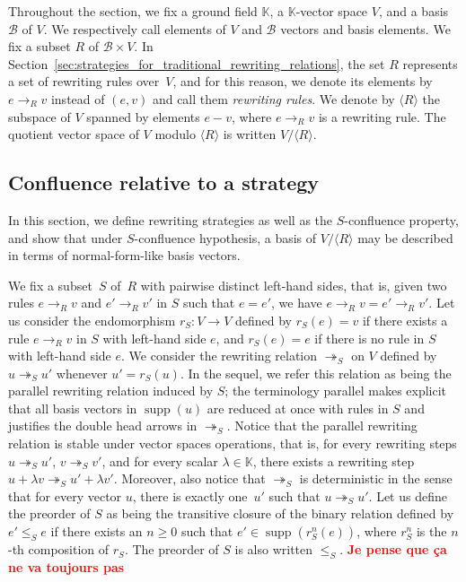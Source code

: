\documentclass[11pt]{article}
\theoremstyle{definition}
\newcommand\todo[1]{{\bf\textcolor{red}{#1}}}
\newcommand\basis{\mathscr{B}}
\newcommand\ordS{\leq_S}
\DeclareMathOperator{\supp}{supp}
\newcommand\K{\mathbb{K}}
\newcommand\Span[1]{\langle #1\rangle}
\newcommand\rewR{\to_R}
\newcommand\parS{\twoheadrightarrow_S}
\begin{document}
Throughout the section, we fix a ground field $\K$, a $\K$-vector space $V$, and
a basis $\basis$ of $V$. We respectively call elements of $V$ and $\basis$
vectors and basis elements. We fix a subset $R$ of $\basis\times V$. In
Section~\ref{sec:strategies_for_traditional_rewriting_relations}, the set $R$
represents a set of rewriting rules over~$V$, and for this reason, we denote its
elements by $e\rewR v$ instead of $(e,v)$ and call them \emph{rewriting
  rules}. We denote by $\Span{R}$ the subspace of $V$ spanned by elements $e-v$,
where $e\rewR v$ is a rewriting rule. The quotient vector space of $V$ modulo
$\Span{R}$ is written $V/\Span{R}$.

\subsection{Confluence relative to a strategy}
\label{sec:confluence_relative_to_a_strategy}

In this section, we define rewriting strategies as well as the $S$-confluence
property, and show that under $S$-confluence hypothesis, a basis of $V/\Span{R}$
may be described in terms of normal-form-like basis vectors.  \medskip


\medskip

We fix a subset~$S$ of~$R$ with pairwise distinct left-hand sides, that is,
given two rules $e\rewR v$ and $e'\rewR v'$ in $S$ such that $e=e'$, we have
$e\rewR v=e'\rewR v'$. Let us consider the endomorphism $r_S:V\to V$ defined by
$r_S(e)=v$ if there exists a rule $e\rewR v$ in $S$ with left-hand side $e$, and
$r_S(e)=e$ if there is no rule in $S$ with left-hand side $e$. We consider the
rewriting relation $\parS$ on $V$ defined by $u\parS u'$ whenever
$u'=r_S(u)$. In the sequel, we refer this relation as being the parallel
rewriting relation induced by $S$; the terminology parallel makes explicit that
all basis vectors in $\supp(u)$ are reduced at once with rules in $S$ and
justifies the double head arrows in $\parS$. Notice that the parallel rewriting
relation is stable under vector spaces operations, that is, for every rewriting
steps $u\parS u'$, $v\parS v'$, and for every scalar $\lambda\in\K$, there exists a
rewriting step $u+\lambda v\parS u'+\lambda v'$. Moreover, also notice that
$\parS$ is deterministic in the sense that for every vector $u$, there is
exactly one~$u'$ such that $u\parS u'$. Let us define the preorder of $S$ as
being the transitive closure of the binary relation defined by $e'\ordS e$ if
there exists an $n \geq 0$ such that $e'\in\supp(r_S^n(e))$, where
$r_S^n$ is the $n$-th composition of $r_S$. The preorder of $S$ is also
written $\ordS$. \todo{Je pense que ça ne va toujours pas}
\smallskip
\end{document}
